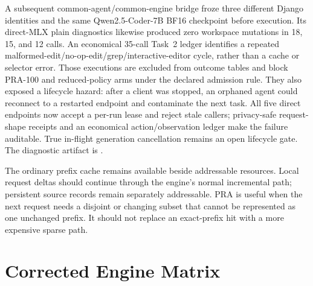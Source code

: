 \documentclass[11pt]{article}
\begin{document}
A subsequent common-agent/common-engine bridge froze three different Django
identities and the same Qwen2.5-Coder-7B BF16 checkpoint before execution.
Its direct-MLX plain diagnostics likewise produced zero workspace mutations in
18, 15, and 12 calls.  An economical 35-call Task~2 ledger identifies a
repeated malformed-edit/no-op-edit/grep/interactive-editor cycle, rather than
a cache or selector error.  Those executions are excluded from outcome tables
and block PRA-100 and reduced-policy arms under the declared admission rule.
They also exposed a lifecycle hazard: after a client was stopped, an orphaned
agent could reconnect to a restarted endpoint and contaminate the next task.
All five direct endpoints now accept a per-run lease and reject stale callers;
privacy-safe request-shape receipts and an economical action/observation ledger
make the failure auditable.  True in-flight generation cancellation remains an
open lifecycle gate.  The diagnostic artifact is
.

The ordinary prefix cache remains available beside addressable resources.
Local request deltas should continue through the engine's normal incremental
path; persistent source records remain separately addressable.  PRA is useful
when the next request needs a disjoint or changing subset that cannot be
represented as one unchanged prefix.  It should not replace an exact-prefix hit
with a more expensive sparse path.

\section{Corrected Engine Matrix}
\end{document}
